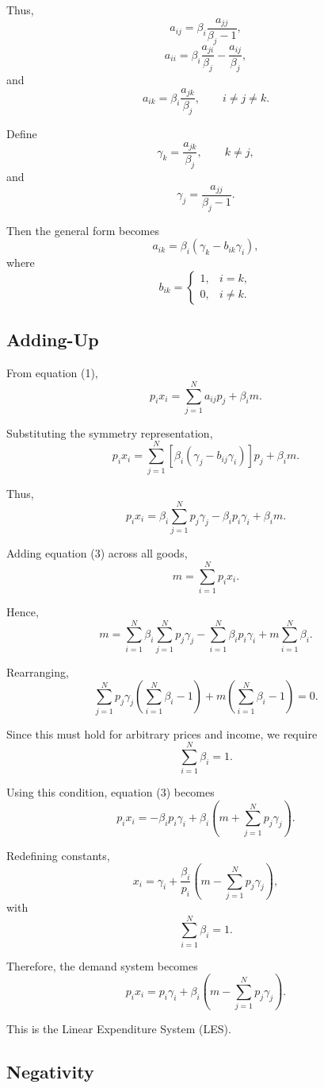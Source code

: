 Thus,
\[
a_{ij}
=
\beta_i
\frac{a_{jj}}{\beta_j-1},
\]
\[
a_{ii}
=
\beta_i
\frac{a_{ji}}{\beta_j}
-
\frac{a_{ij}}{\beta_j},
\]
and
\[
a_{ik}
=
\beta_i
\frac{a_{jk}}{\beta_j},
\qquad
i\ne j\ne k.
\]

Define
\[
\gamma_k
=
\frac{a_{jk}}{\beta_j},
\qquad
k\ne j,
\]
and
\[
\gamma_j
=
\frac{a_{jj}}{\beta_j-1}.
\]

Then the general form becomes
\[
a_{ik}
=
\beta_i
(\gamma_k-b_{ik}\gamma_i),
\]
where
\[
b_{ik}
=
\begin{cases}
1, & i=k,\\
0, & i\ne k.
\end{cases}
\]

\subsection{Adding-Up}

From equation (1),
\[
p_ix_i
=
\sum_{j=1}^N a_{ij}p_j+\beta_im.
\]

Substituting the symmetry representation,
\[
p_ix_i
=
\sum_{j=1}^N
\left[
\beta_i(\gamma_j-b_{ij}\gamma_i)
\right]p_j
+
\beta_im.
\]

Thus,
\[
p_ix_i
=
\beta_i\sum_{j=1}^N p_j\gamma_j
-
\beta_ip_i\gamma_i
+
\beta_im.
\tag{3}
\]

Adding equation (3) across all goods,
\[
m
=
\sum_{i=1}^N p_ix_i.
\]

Hence,
\[
m
=
\sum_{i=1}^N
\beta_i
\sum_{j=1}^N p_j\gamma_j
-
\sum_{i=1}^N \beta_ip_i\gamma_i
+
m\sum_{i=1}^N\beta_i.
\]

Rearranging,
\[
\sum_{j=1}^N p_j\gamma_j
\left(
\sum_{i=1}^N\beta_i-1
\right)
+
m
\left(
\sum_{i=1}^N\beta_i-1
\right)
=
0.
\]

Since this must hold for arbitrary prices and income,
we require
\[
\sum_{i=1}^N\beta_i=1.
\]

Using this condition,
equation (3) becomes
\[
p_ix_i
=
-\beta_ip_i\gamma_i
+
\beta_i
\left(
m+\sum_{j=1}^N p_j\gamma_j
\right).
\]

Redefining constants,
\[
x_i
=
\gamma_i
+
\frac{\beta_i}{p_i}
\left(
m-\sum_{j=1}^N p_j\gamma_j
\right),
\]
with
\[
\sum_{i=1}^N\beta_i=1.
\]

Therefore,
the demand system becomes
\[
p_ix_i
=
p_i\gamma_i
+
\beta_i
\left(
m-\sum_{j=1}^N p_j\gamma_j
\right).
\]

This is the Linear Expenditure System (LES).

\subsection{Negativity}

